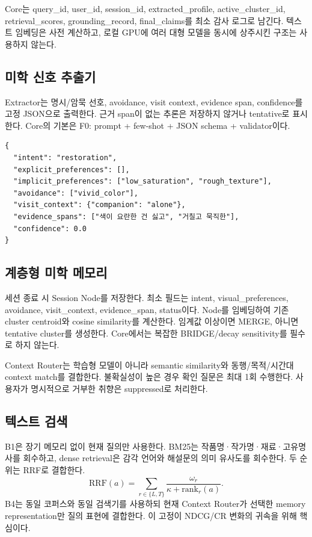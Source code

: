 \documentclass[10pt,a4paper,twocolumn]{article}
\newcommand{\EmbeddingModel}{\texttt{[TEXT\_EMBEDDING\_MODEL]}}
\begin{document}
Core는 query\_id, user\_id, session\_id, extracted\_profile, active\_cluster\_id, retrieval\_scores, grounding\_record, final\_claims를 최소 감사 로그로 남긴다. 텍스트 임베딩은 사전 계산하고, 로컬 GPU에 여러 대형 모델을 동시에 상주시킨 구조는 사용하지 않는다.

\subsection{미학 신호 추출기}
Extractor는 명시/암묵 선호, avoidance, visit context, evidence span, confidence를 고정 JSON으로 출력한다. 근거 span이 없는 추론은 저장하지 않거나 tentative로 표시한다. Core의 기본은 F0: prompt + few-shot + JSON schema + validator이다.

\begin{lstlisting}[caption={Extractor 출력 예시(스키마 뼈대)}]
{
  "intent": "restoration",
  "explicit_preferences": [],
  "implicit_preferences": ["low_saturation", "rough_texture"],
  "avoidance": ["vivid_color"],
  "visit_context": {"companion": "alone"},
  "evidence_spans": ["색이 요란한 건 싫고", "거칠고 묵직한"],
  "confidence": 0.0
}
\end{lstlisting}

\subsection{계층형 미학 메모리}
세션 종료 시 Session Node를 저장한다. 최소 필드는 intent, visual\_preferences, avoidance, visit\_context, evidence\_span, status이다. Node를  임베딩하여 기존 cluster centroid와 cosine similarity를 계산한다. 임계값 이상이면 MERGE, 아니면 tentative cluster를 생성한다. Core에서는 복잡한 BRIDGE/decay sensitivity를 필수로 하지 않는다.

Context Router는 학습형 모델이 아니라 semantic similarity와 동행/목적/시간대 context match를 결합한다. 불확실성이 높은 경우 확인 질문은 최대 1회 수행한다. 사용자가 명시적으로 거부한 취향은 suppressed로 처리한다.

\subsection{텍스트 검색}
B1은 장기 메모리 없이 현재 질의만 사용한다. BM25는 작품명·작가명·재료·고유명사를 회수하고, dense retrieval은 감각 언어와 해설문의 의미 유사도를 회수한다. 두 순위는 RRF로 결합한다\cite{cormack2009rrf}.
\begin{equation}
\mathrm{RRF}(a)=\sum_{r\in\{L,T\}}\frac{\omega_r}{\kappa+\mathrm{rank}_r(a)}.
\end{equation}
B4는 동일 코퍼스와 동일 검색기를 사용하되 현재 Context Router가 선택한 memory representation만 질의 표현에 결합한다. 이 고정이 NDCG/CR 변화의 귀속을 위해 핵심이다.
\end{document}
